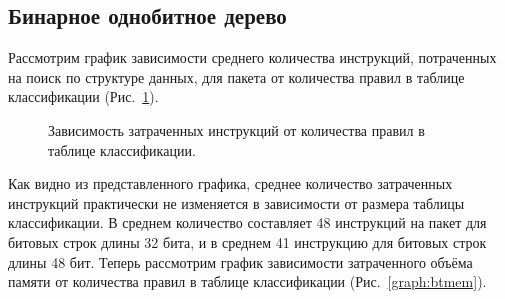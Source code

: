 \documentclass[conference]{IEEEtran}
\begin{document}
        \subsection{Бинарное однобитное дерево}
            Рассмотрим график зависимости среднего количества инструкций, потраченных на поиск по структуре данных, для пакета от количества правил в таблице классификации (Рис.~\ref{graph:btinst}).
            \begin{figure}[!htbp]
                \centering
                \captionsetup{justification=centering}
                \caption{Зависимость затраченных инструкций от количества правил в таблице классификации.}
                \label{graph:btinst}
            \end{figure}
            Как видно из представленного графика, среднее количество затраченных инструкций практически не изменяется в зависимости от размера таблицы классификации. 
            В среднем количество составляет 48 инструкций на пакет для битовых строк длины 32 бита, и в среднем 41 инструкцию для битовых строк длины 48 бит.
            Теперь рассмотрим график зависимости затраченного объёма памяти от количества правил в таблице классификации (Рис.~\ref{graph:btmem}).
\end{document}

